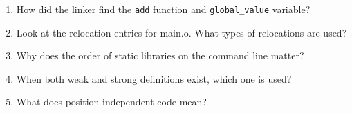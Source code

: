 \begin{enumerate}
\item How did the linker find the \texttt{add} function and \texttt{global\_value} variable?
\item Look at the relocation entries for main.o. What types of relocations are used?
\item Why does the order of static libraries on the command line matter?
\item When both weak and strong definitions exist, which one is used?
\item What does position-independent code mean?
\end{enumerate}
